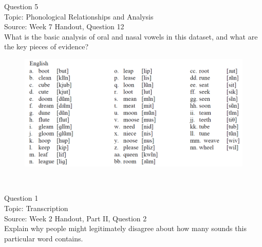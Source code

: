 \documentclass[12pt]{article}
\begin{document}
\newpage

{\large Question 5}\\

Topic: Phonological Relationships and Analysis\\
Source: Week 7 Handout, Question 12\\

What is the basic analysis of oral and nasal vowels in this dataset, and what are the key pieces of evidence?\\

\begin{figure}[H]
\includegraphics{../images/english12.png}
\end{figure}

\newpage

\begin{center}
\textbf{{\color{red}{\HUGE END OF EXAM}}}\\

\end{center}
\newpage

\begin{center}
\textbf{{\color{blue}{\HUGE START OF EXAM\\}}}

\textbf{{\color{blue}{\HUGE Student ID: 15082\\}}}

\textbf{{\color{blue}{\HUGE \\}}}

\end{center}
\newpage

{\large Question 1}\\

Topic: Transcription\\
Source: Week 2 Handout, Part II, Question 2\\

Explain why people might legitimately disagree about how many sounds this particular word contains.\\
\end{document}
